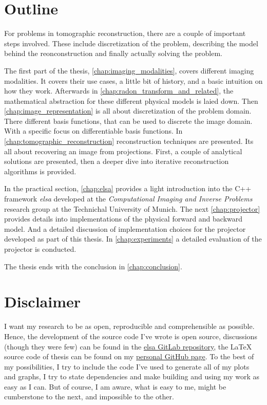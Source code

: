 \section{Outline}\label{sec:outline}

For problems in tomographic reconstruction, there are a couple of important steps involved. These
include discretization of the problem, describing the model behind the reonconstruction and finally
actually solving the problem.

The first part of the thesis, \autoref{chap:imaging_modalities}, covers different imaging
modalities. It covers their use cases, a little bit of history, and a basic intuition on how they
work. Afterwards in \autoref{chap:radon_transform_and_related}, the mathematical abstraction for
these different physical models is laied down. Then \autoref{chap:image_representation} is all about
discretization of the problem domain. There different basis functions, that can be used to discrete
the image domain. With a specific focus on differentiable basis functions. In
\autoref{chap:tomographic_reconstruction} reconstruction techniques are presented. Its all about
recovering an image from projections. First, a couple of analytical solutions are presented, then a
deeper dive into iterative reconstruction algorithms is provided.

In the practical section, \autoref{chap:elsa} provides a light introduction into the C++ framework
\textit{elsa} developed at the \textit{Computational Imaging and Inverse Problems} research group at
the Technichal University of Munich. The next \autoref{chap:projector} provides details into
implementations of the physical forward and backward model. And a detailed discussion of
implementation choices for the projector developed as part of this thesis. In
\autoref{chap:experiments} a detailed evaluation of the projector is conducted.

The thesis ends with the conclusion in \autoref{chap:conclusion}.

\section{Disclaimer}\label{sec:disclaimer}

I want my research to be as open, reproducible and comprehensible as possible. Hence, the
development of the source code I've wrote is open source, discussions (though they were few) can be
found in the \href{https://gitlab.lrz.de/IP/elsa}{elsa GitLab repository}, the \LaTeX{} source code
of thesis can be found on my
\href{https://github.com/ner0-m/ma-thesis-differential-basis-for-ct}{personal GitHub page}. To the
best of my possibilities, I try to include the code I've used to generate all of my plots and
graphs, I try to state dependencies and make building and using my work as easy as I can. But of
course, I am aware, what is easy to me, might be cumberstone to the next, and impossible to the
other.

